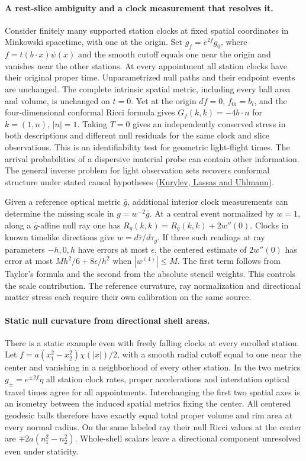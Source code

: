 \documentclass[11pt]{article}
\begin{document}
\paragraph{A rest-slice ambiguity and a clock measurement that resolves it.}
Consider finitely many supported station clocks at fixed spatial coordinates
in Minkowski spacetime, with one at the origin. Set
\(g_f=e^{2f}g_0\), where \(f=t(b\cdot x)\psi(x)\) and the smooth cutoff
equals one near the origin and vanishes near the other stations. At every
appointment all station clocks have their original proper time.
Unparametrized null paths and their endpoint events are unchanged.
The complete intrinsic spatial metric, including every ball area and
volume, is unchanged on \(t=0\). Yet at the origin \(df=0\),
\(f_{0i}=b_i\), and the four-dimensional conformal Ricci formula gives
\(G_f(k,k)=-4b\cdot n\) for \(k=(1,n)\), \(|n|=1\). Taking \(T=0\)
gives an independently conserved stress in both descriptions and
different null residuals for the same clock and slice observations.
This is an identifiability test for geometric light-flight times.
The arrival probabilities of a dispersive material probe can contain
other information. The general inverse problem for light observation
sets recovers conformal structure under stated causal hypotheses
(\href{https://arxiv.org/abs/1405.3386}{Kurylev, Lassas and Uhlmann}).

Given a reference optical metric \(\bar g\), additional interior clock
measurements can determine the missing scale in \(g=w^{-2}\bar g\).
At a central event normalized by \(w=1\), along a \(\bar g\)-affine
null ray one has \(R_g(k,k)=R_{\bar g}(k,k)+2w''(0)\).
Clocks in known timelike directions give \(w=d\bar\tau/d\tau_g\).
If three such readings at ray parameters \(-h,0,h\) have errors
at most \(\epsilon\), the centered estimate of \(2w''(0)\) has error
at most \(Mh^2/6+8\epsilon/h^2\) when \(|w^{(4)}|\le M\).
The first term follows from Taylor's formula and the second from the
absolute stencil weights. This controls the scale contribution. The
reference curvature, ray normalization and directional matter stress
each require their own calibration on the same source.

\paragraph{Static null curvature from directional shell areas.}
There is a static example even with freely falling clocks at every
enrolled station. Let
\(f=a(x_1^2-x_2^2)\chi(|x|)/2\), with a smooth radial cutoff equal to
one near the center and vanishing in a neighborhood of every other
station. In the two metrics \(g_\pm=e^{\pm2f}\eta\) all station clock
rates, proper accelerations and interstation optical travel times
agree for all appointments. Interchanging the first two spatial axes is
an isometry between the induced spatial metrics fixing the center.
All centered geodesic balls therefore have exactly equal total proper
volume and rim area at every normal radius. On the same labeled ray
their null Ricci values at the center are
\(\mp2a(n_1^2-n_2^2)\). Whole-shell scalars leave a directional
component unresolved even under staticity.
\end{document}
